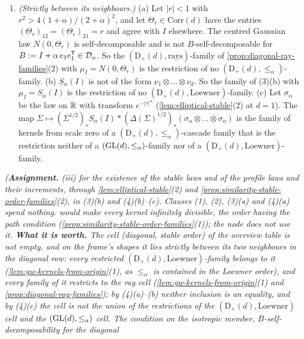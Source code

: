 \begin{proposition}
\begin{enumerate}
in particular for $\mu_I = S_\beta(I)$, $\alpha \le \beta < 2$.
\item \emph{(Strictly between its neighbours.)} (a) Let $|r| < 1$ with $r^2 > 4(1+\alpha)/(2+\alpha)^2$, and
let $\Theta_r \in \mathrm{Corr}(d)$ have the entries $(\Theta_r)_{12} = (\Theta_r)_{21} = r$ and agree with $I$ elsewhere.
The centred Gaussian law $N(0, \Theta_r)$ is self-decomposable and is not $B$-self-decomposable for
$B := I + \alpha\,e_1e_1^{\mathsf{T}} \in \mathcal D_\alpha$. So the $(\mathrm D_+(d), \text{rays})$-family of
\ref{prop:diagonal-ray-families}(2) with $\mu_I = N(0, \Theta_r)$ is the restriction of no
$(\mathrm D_+(d), \le_\alpha)$-family.
(b) $S_\alpha(I)$ is not of the form $\nu_1 \otimes \dots \otimes \nu_d$. So the family of (3)(b) with
$\mu_I = S_\alpha(I)$ is the restriction of no $(\mathrm D_+(d), \text{Loewner})$-family.
(c) Let $\sigma_\alpha$ be the law on $\mathbb{R}$ with transform $e^{-|\tau|^\alpha}$ (\ref{lem:elliptical-stable}(2)
at $d = 1$). The map $\Sigma \mapsto (\Sigma^{1/2})_*S_\alpha(I) * (\Delta(\Sigma)^{1/2})_*(\sigma_\alpha
\otimes \dots \otimes \sigma_\alpha)$ is the family of kernels from scale zero of a
$(\mathrm D_+(d), \le_\alpha)$-cascade family that is the restriction neither of a
$(\mathrm{GL}(d), \le_\alpha)$-family nor of a $(\mathrm D_+(d), \text{Loewner})$-family.
\end{enumerate}
\statusA\quad{}\quad\emph{(\textbf{Assignment.} (iii) for the existence of the stable
laws and of the profile laws and their increments, through \ref{lem:elliptical-stable}(2) and
\ref{prop:similarity-stable-order-families}(2), in (3)(b) and (4)(b)--(c). Clauses (1), (2), (3)(a) and
(4)(a) spend nothing.  would make every kernel infinitely divisible, the order having the path
condition (\ref{prop:similarity-stable-order-families}(1)); the node does not use it. \textbf{What it is
worth.} The cell (diagonal, stable order) of the overview table is not empty, and on the frame's shapes it
lies strictly between its two neighbours in the diagonal row: every restricted
$(\mathrm D_+(d), \text{Loewner})$-family belongs to it (\ref{lem:gw-kernels-from-origin}(1), as
$\le_\alpha$ is contained in the Loewner order), and every family of it restricts to the ray cell
(\ref{lem:gw-kernels-from-origin}(1) and \ref{prop:diagonal-ray-families}); by (4)(a)--(b) neither inclusion is an equality, and by (4)(c) the cell
is not the union of the restrictions of the $(\mathrm D_+(d), \text{Loewner})$ cell and the
$(\mathrm{GL}(d), \le_\alpha)$ cell. The condition on the isotropic member, $B$-self-decomposability for the diagonal
}
\end{proposition}
